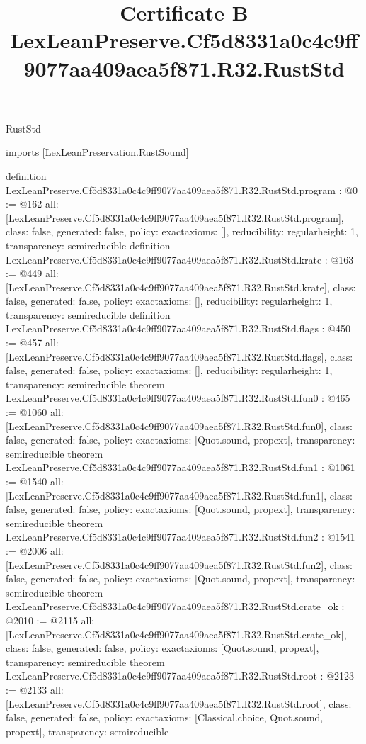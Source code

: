 \begin{lexlean}{RustStd}
\title{Certificate B LexLeanPreserve.Cf5d8331a0c4c9ff9077aa409aea5f871.R32.RustStd}
\begin{coremodule}
imports [LexLeanPreservation.RustSound]

definition LexLeanPreserve.Cf5d8331a0c4c9ff9077aa409aea5f871.R32.RustStd.program : @0 := @162 {
  all: [LexLeanPreserve.Cf5d8331a0c4c9ff9077aa409aea5f871.R32.RustStd.program],
  class: false,
  generated: false,
  policy: exact{axioms: []},
  reducibility: regular{height: 1},
  transparency: semireducible
}
definition LexLeanPreserve.Cf5d8331a0c4c9ff9077aa409aea5f871.R32.RustStd.krate : @163 := @449 {
  all: [LexLeanPreserve.Cf5d8331a0c4c9ff9077aa409aea5f871.R32.RustStd.krate],
  class: false,
  generated: false,
  policy: exact{axioms: []},
  reducibility: regular{height: 1},
  transparency: semireducible
}
definition LexLeanPreserve.Cf5d8331a0c4c9ff9077aa409aea5f871.R32.RustStd.flags : @450 := @457 {
  all: [LexLeanPreserve.Cf5d8331a0c4c9ff9077aa409aea5f871.R32.RustStd.flags],
  class: false,
  generated: false,
  policy: exact{axioms: []},
  reducibility: regular{height: 1},
  transparency: semireducible
}
theorem LexLeanPreserve.Cf5d8331a0c4c9ff9077aa409aea5f871.R32.RustStd.fun0 : @465 := @1060 {
  all: [LexLeanPreserve.Cf5d8331a0c4c9ff9077aa409aea5f871.R32.RustStd.fun0],
  class: false,
  generated: false,
  policy: exact{axioms: [Quot.sound, propext]},
  transparency: semireducible
}
theorem LexLeanPreserve.Cf5d8331a0c4c9ff9077aa409aea5f871.R32.RustStd.fun1 : @1061 := @1540 {
  all: [LexLeanPreserve.Cf5d8331a0c4c9ff9077aa409aea5f871.R32.RustStd.fun1],
  class: false,
  generated: false,
  policy: exact{axioms: [Quot.sound, propext]},
  transparency: semireducible
}
theorem LexLeanPreserve.Cf5d8331a0c4c9ff9077aa409aea5f871.R32.RustStd.fun2 : @1541 := @2006 {
  all: [LexLeanPreserve.Cf5d8331a0c4c9ff9077aa409aea5f871.R32.RustStd.fun2],
  class: false,
  generated: false,
  policy: exact{axioms: [Quot.sound, propext]},
  transparency: semireducible
}
theorem LexLeanPreserve.Cf5d8331a0c4c9ff9077aa409aea5f871.R32.RustStd.crate_ok : @2010 := @2115 {
  all: [LexLeanPreserve.Cf5d8331a0c4c9ff9077aa409aea5f871.R32.RustStd.crate_ok],
  class: false,
  generated: false,
  policy: exact{axioms: [Quot.sound, propext]},
  transparency: semireducible
}
theorem LexLeanPreserve.Cf5d8331a0c4c9ff9077aa409aea5f871.R32.RustStd.root : @2123 := @2133 {
  all: [LexLeanPreserve.Cf5d8331a0c4c9ff9077aa409aea5f871.R32.RustStd.root],
  class: false,
  generated: false,
  policy: exact{axioms: [Classical.choice, Quot.sound, propext]},
  transparency: semireducible
}


\end{coremodule}
\end{lexlean}
